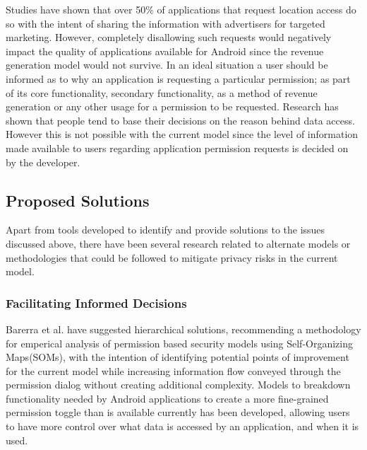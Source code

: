 Studies have shown that over 50\% of applications that request location access do so with the intent of sharing the information with advertisers for targeted marketing\cite{saint201050}. However, completely disallowing such requests would negatively impact the quality of applications available for Android since the revenue generation model would not survive. \cite{aa} In an ideal situation a user should be informed as to why an application is requesting a particular permission; as part of its core functionality, secondary functionality, as a method of revenue generation or any other usage for a permission to be requested. Research has shown that people tend to base their decisions on the reason behind data access\cite{lin2014modeling}. However this is not possible with the current model since the level of information made available to users regarding application permission requests is decided on by the developer.

\subsection{Proposed Solutions}
Apart from tools developed to identify and provide solutions to the issues discussed above, there have been several research related to alternate models or methodologies that could be followed to mitigate privacy risks in the current model.

\subsubsection{Facilitating Informed Decisions}
Barerra et al. have suggested hierarchical solutions, recommending a methodology for emperical analysis of permission based security models using Self-Organizing Maps(SOMs), with the intention of identifying potential points of improvement for the current model while increasing information flow conveyed through the permission dialog without creating additional complexity\cite{barrera2010methodology}. Models to breakdown functionality needed by Android applications to create a more fine-grained permission toggle than is available currently has been developed, allowing users to have more control over what data is accessed by an application, and when it is used\cite{bugiel2013flexible}. 
\smallskip

